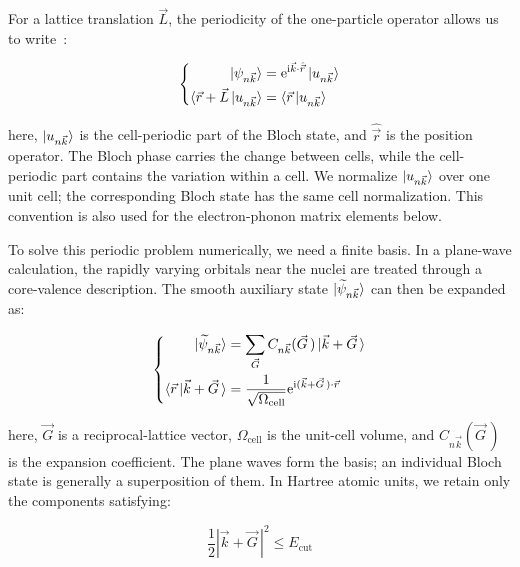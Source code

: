 For a lattice translation $\vec{L}$, the periodicity of the one-particle operator allows us to write~\cite{martin2020electronic}:

\begin{equation}
\left\{\begin{aligned}
    \ket{\psi_{n\vec{k}}}
    &=\mathrm{e}^{\mathrm{i}\vec{k}\cdot\hat{\vec{r}}}\ket{u_{n\vec{k}}} \\
    \braket{\vec{r}+\vec{L}\,|u_{n\vec{k}}}
    &=\braket{\vec{r}\,|u_{n\vec{k}}}
\end{aligned}\right.
\label{bloch_state_cell_periodic_method}
\end{equation}

here, $\ket{u_{n\vec{k}}}$ is the cell-periodic part of the Bloch state,
and $\hat{\vec{r}}$ is the position operator.
The Bloch phase carries the change between cells, while the cell-periodic part contains the variation within a cell.
We normalize $\ket{u_{n\vec{k}}}$ over one unit cell;
the corresponding Bloch state has the same cell normalization.
This convention is also used for the electron-phonon matrix elements below.

To solve this periodic problem numerically, we need a finite basis.
In a plane-wave calculation, the rapidly varying orbitals near the nuclei are treated through a core-valence description.
The smooth auxiliary state $\ket{\widetilde{\psi}_{n\vec{k}}}$ can then be expanded as:

\begin{equation}
\left\{\begin{aligned}
    \ket{\widetilde{\psi}_{n\vec{k}}}
    &=\sum_{\vec{G}}C_{n\vec{k}}(\vec{G}\,)\ket{\vec{k}+\vec{G}\,} \\
    \braket{\vec{r}\,|\vec{k}+\vec{G}\,}
    &=\frac{1}{\sqrt{\Omega_\mathrm{cell}}}
    \mathrm{e}^{\mathrm{i}(\vec{k}+\vec{G}\,)\cdot\vec{r}}
\end{aligned}\right.
\label{plane_wave_expansion_method}
\end{equation}

here, $\vec{G}$ is a reciprocal-lattice vector,
$\Omega_\mathrm{cell}$ is the unit-cell volume,
and $C_{n\vec{k}}(\vec{G}\,)$ is the expansion coefficient.
The plane waves form the basis; an individual Bloch state is generally a superposition of them.
In Hartree atomic units, we retain only the components satisfying:

\begin{equation}
    \frac{1}{2}|\vec{k}+\vec{G}\,|^2\leq E_\mathrm{cut}
\label{plane_wave_cutoff_method}
\end{equation}

